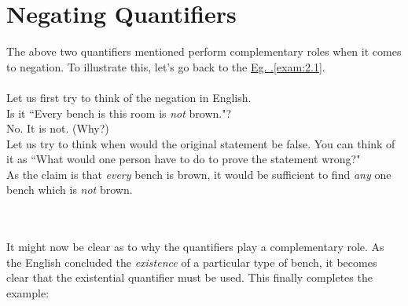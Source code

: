 \section{Negating Quantifiers}\label{sec:negquant}
The above two quantifiers mentioned perform complementary roles when it comes to negation. To illustrate this, let's go back to the \hyperref[exam:2.1]{Eg. \thechapter.\ref*{exam:2.1}}.
\\~\\
Let us first try to think of the negation in English.\\
Is it ``Every bench is this room is \textit{not} brown."?\\
No. It is not. (Why?)\\
Let us try to think when would the original statement be false. You can think of it as ``What would one person have to do to prove the statement wrong?"\\
As the claim is that \textit{every} bench is brown, it would be sufficient to find \textit{any} one bench which is \textit{not} brown.
\addtocounter{example}{-1}
\\~\\
It might now be clear as to why the quantifiers play a complementary role. As the English concluded the \textit{existence} of a particular type of bench, it becomes clear that the existential quantifier must be used. This finally completes the example:
